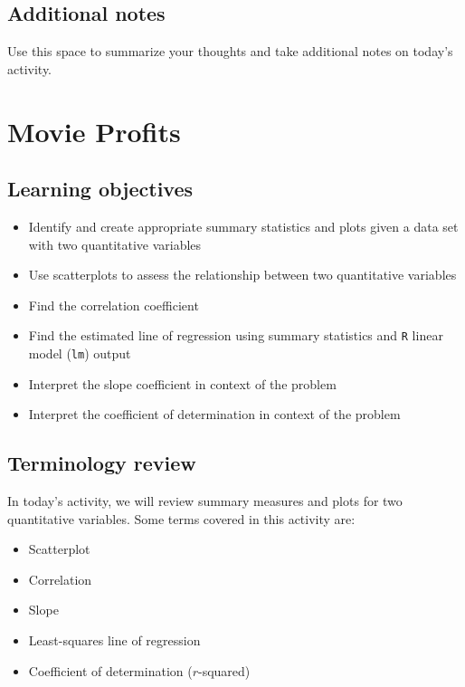 \documentclass[
]{report}
\begin{document}
\hypertarget{additional-notes}{%
\section{Additional notes}\label{additional-notes}}

Use this space to summarize your thoughts and take additional notes on today's activity.

\hypertarget{movie-profits}{%
\chapter{Movie Profits}\label{movie-profits}}

\hypertarget{learning-objectives}{%
\section{Learning objectives}\label{learning-objectives}}

\begin{itemize}
\item
  Identify and create appropriate summary statistics and plots
  given a data set with two quantitative variables
\item
  Use scatterplots to assess the relationship between two quantitative variables
\item
  Find the correlation coefficient
\item
  Find the estimated line of regression using summary statistics and \texttt{R} linear model (\texttt{lm}) output
\item
  Interpret the slope coefficient in context of the problem
\item
  Interpret the coefficient of determination in context of the problem
\end{itemize}

\hypertarget{terminology-review}{%
\section{Terminology review}\label{terminology-review}}

In today's activity, we will review summary measures and plots for two quantitative variables. Some terms covered in this activity are:

\begin{itemize}
\item
  Scatterplot
\item
  Correlation
\item
  Slope
\item
  Least-squares line of regression
\item
  Coefficient of determination (\(r\)-squared)
\end{itemize}
\end{document}

